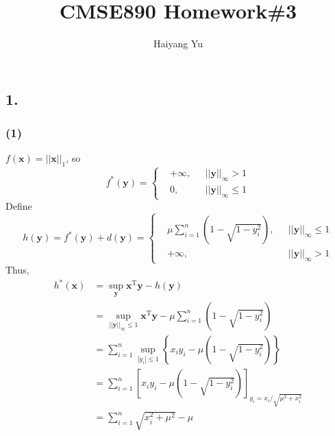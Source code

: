 \documentclass{article}
\title{CMSE890 Homework\#3}
\author{Haiyang Yu}
\begin{document}
\maketitle
\subsection*{1.}
\subsubsection*{(1)}
$f(\bm{x})=||\bm{x}||_{1}$, so
$$
f^{*}(\bm{y})=\left\{
\begin{aligned}
&+\infty,&\ \ \ ||\bm{y}||_{\infty}>1\\
&0,&\ \ \ ||\bm{y}||_{\infty}\leq1
\end{aligned}
\right.
$$
Define
$$
h(\bm{y})=f^{*}(\bm{y})+d(\bm{y})=\left\{
\begin{aligned}
&\mu\sum_{i=1}^{n}(1-\sqrt{1-y_{i}^{2}}),&\ \ \ ||\bm{y}||_{\infty}\leq1\\
&+\infty,&\ \ \ ||\bm{y}||_{\infty}>1
\end{aligned}
\right.
$$
Thus,
\begin{align*}
h^{*}(\bm{x})&=\sup_{\bm{y}}\bm{x}^{\mathrm{T}}\bm{y}-h(\bm{y})\\
&=\sup_{||\bm{y}||_{\infty}\leq 1}\bm{x}^{\mathrm{T}}\bm{y}-\mu\sum_{i=1}^{n}(1-\sqrt{1-y_{i}^{2}})\\
&=\sum_{i=1}^{n}\sup_{|y_{i}|\leq 1}\left\{x_{i}y_{i}-\mu(1-\sqrt{1-y_{i}^{2}})\right\}\\
&=\sum_{i=1}^{n}\left[x_{i}y_{i}-\mu(1-\sqrt{1-y_{i}^{2}})\right]_{y_{i}={x_{i}}/{\sqrt{\mu^{2}+x_{i}^{2}}}}\\
&=\sum_{i=1}^{n}\sqrt{x_{i}^{2}+\mu^{2}}-\mu
\end{align*}
\end{document}
